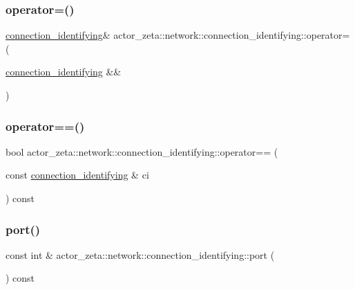 \subsubsection{\texorpdfstring{operator=()}{operator=()}\hspace{0.1cm}{\footnotesize\ttfamily [2/2]}}
{\footnotesize\ttfamily \hyperlink{classactor__zeta_1_1network_1_1connection__identifying}{connection\+\_\+identifying}\& actor\+\_\+zeta\+::network\+::connection\+\_\+identifying\+::operator= (\begin{DoxyParamCaption}\item[{\hyperlink{classactor__zeta_1_1network_1_1connection__identifying}{connection\+\_\+identifying} \&\&}]{ }\end{DoxyParamCaption})\hspace{0.3cm}{\ttfamily [default]}}

\mbox{\label{classactor__zeta_1_1network_1_1connection__identifying_ab283bc5ac9dcbddaad3140bfabe9f137}} 
\subsubsection{\texorpdfstring{operator==()}{operator==()}}
{\footnotesize\ttfamily bool actor\+\_\+zeta\+::network\+::connection\+\_\+identifying\+::operator== (\begin{DoxyParamCaption}\item[{const \hyperlink{classactor__zeta_1_1network_1_1connection__identifying}{connection\+\_\+identifying} \&}]{ci }\end{DoxyParamCaption}) const}

\mbox{\label{classactor__zeta_1_1network_1_1connection__identifying_aa5b0146888f91c56a74d96a9853788cf}} 
\subsubsection{\texorpdfstring{port()}{port()}}
{\footnotesize\ttfamily const int \& actor\+\_\+zeta\+::network\+::connection\+\_\+identifying\+::port (\begin{DoxyParamCaption}{ }\end{DoxyParamCaption}) const}


